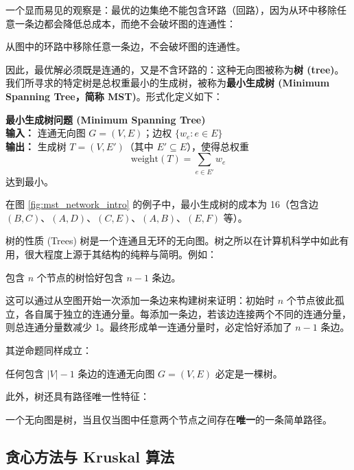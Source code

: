 一个显而易见的观察是：最优的边集绝不能包含环路（回路），因为从环中移除任意一条边都会降低总成本，而绝不会破坏图的连通性：

\begin{property}
从图中的环路中移除任意一条边，不会破坏图的连通性。
\end{property}

因此，最优解必须既是连通的，又是不含环路的：这种无向图被称为\textbf{树 (tree)}。我们所寻求的特定树是总权重最小的生成树，被称为\textbf{最小生成树 (Minimum Spanning Tree，简称 MST)}。形式化定义如下：

\begin{tcolorbox}[colback=white,colframe=gray!50!black]
\textbf{最小生成树问题 (Minimum Spanning Tree)} \\
\textbf{输入：} 连通无向图 $G = (V, E)$；边权 $\{w_e : e \in E\}$ \\
\textbf{输出：} 生成树 $T = (V, E')$（其中 $E' \subseteq E$），使得总权重
\[
\text{weight}(T) = \sum_{e \in E'} w_e
\]
达到最小。
\end{tcolorbox}

在图 \ref{fig:mst_network_intro} 的例子中，最小生成树的成本为 16（包含边 $(B, C)$、$(A, D)$、$(C, E)$、$(A, B)$、$(E, F)$ 等）。

\begin{sidebarbox}{树的性质 (Trees)}
树是一个连通且无环的无向图。树之所以在计算机科学中如此有用，很大程度上源于其结构的纯粹与简明。例如：

\begin{property}
包含 $n$ 个节点的树恰好包含 $n - 1$ 条边。
\end{property}
这可以通过从空图开始一次添加一条边来构建树来证明：初始时 $n$ 个节点彼此孤立，各自属于独立的连通分量。每添加一条边，若该边连接两个不同的连通分量，则总连通分量数减少 1。最终形成单一连通分量时，必定恰好添加了 $n - 1$ 条边。

其逆命题同样成立：
\begin{property}
任何包含 $|V| - 1$ 条边的连通无向图 $G = (V, E)$ 必定是一棵树。
\end{property}

此外，树还具有路径唯一性特征：
\begin{property}
一个无向图是树，当且仅当图中任意两个节点之间存在\textbf{唯一}的一条简单路径。
\end{property}
\end{sidebarbox}

\subsection{贪心方法与 Kruskal 算法}

